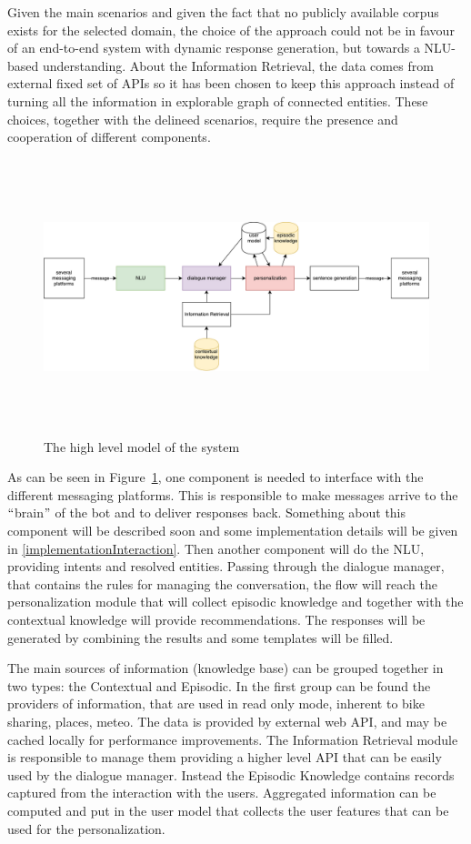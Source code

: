 Given the main scenarios and given the fact that no publicly available corpus exists for the selected domain, the choice of the approach could not be in favour of an end-to-end system with dynamic response generation, but towards a NLU-based understanding. About the Information Retrieval, the data comes from external fixed set of APIs so it has been chosen to keep this approach instead of turning all the information in explorable graph of connected entities. These choices, together with the delineed scenarios, require the presence and cooperation of different components.

\begin{figure}[!htbp]
    \centering
    \includegraphics[max width=\linewidth,max height=8cm,keepaspectratio]{figures/systemHighLevel}
    \caption{The high level model of the system}\label{fig:systemHighLevel}
\end{figure}

As can be seen in Figure~\ref{fig:systemHighLevel}, one component is needed to interface with the different messaging platforms. This is responsible to make messages arrive to the $``$brain$"$  of the bot and to deliver responses back. Something about this component will be described soon and some implementation details will be given in \ref{implementationInteraction}. Then another component will do the NLU, providing intents and resolved entities. Passing through the dialogue manager, that contains the rules for managing the conversation, the flow will reach the personalization module that will collect episodic knowledge and together with the contextual knowledge will provide recommendations. The responses will be generated by combining the results and some templates will be filled.

The main sources of information (knowledge base) can be grouped together in two types: the Contextual and Episodic. In the first group can be found the providers of information, that are used in read only mode, inherent to bike sharing, places, meteo. The data is provided by external web API, and may be cached locally for performance improvements. The Information Retrieval module is responsible to manage them providing a higher level API that can be easily used by the dialogue manager. Instead the Episodic Knowledge contains records captured from the interaction with the users. Aggregated information can be computed and put in the user model that collects the user features that can be used for the personalization.

